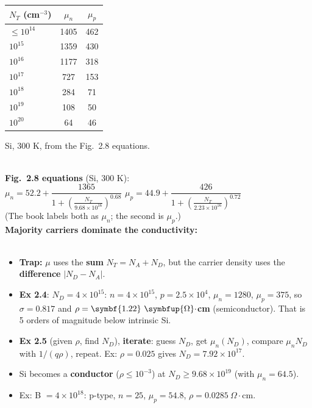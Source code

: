     \begin{minipage}[c]{0.55\linewidth}\raggedright
        {\setlength{\tabcolsep}{2pt}%
        \begin{tabular}{|l|c|c|}
            \hline
            $N_T$ (cm$^{-3}$) & $\mu_n$ & $\mu_p$ \\ \hline
            $\le10^{14}$ & 1405 & 462 \\ \hline
            $10^{15}$ & 1359 & 430 \\ \hline
            $10^{16}$ & 1177 & 318 \\ \hline
            $10^{17}$ & 727 & 153 \\ \hline
            $10^{18}$ & 284 & 71 \\ \hline
            $10^{19}$ & 108 & 50 \\ \hline
            $10^{20}$ & 64 & 46 \\ \hline
        \end{tabular}\par}
        {\color{gray}Si, 300 K, from the Fig.\ 2.8 equations.}
    \end{minipage}\\[2pt]
    \textbf{Fig.\ 2.8 equations} (Si, 300 K): \\
    $\mu_n = 52.2 + \dfrac{1365}{1 + \left(\frac{N_T}{9.68\times10^{16}}\right)^{0.68}}$ \quad
    $\mu_p = 44.9 + \dfrac{426}{1 + \left(\frac{N_T}{2.23\times10^{16}}\right)^{0.72}}$\\
    {\color{gray}(The book labels both as $\mu_n$; the second is $\mu_p$.)}\\[1pt]
    \textbf{Majority carriers dominate the conductivity:} \\
    \
    \begin{itemize}
        \item \textbf{Trap:} $\mu$ uses the \textbf{sum} $N_T = N_A + N_D$, but the carrier density uses the \textbf{difference} $|N_D - N_A|$.
        \item \textbf{Ex 2.4}: $N_D = 4\times10^{15}$: $n = 4\times10^{15}$, $p = 2.5\times10^4$, $\mu_n = 1280$, $\mu_p = 375$, so $\sigma = 0.817$ and $\rho = \symbf{1.22}\ \symbfup{\Omega}\cdot$\textbf{cm} (semiconductor). That is 5 orders of magnitude below intrinsic Si. 
        \item \textbf{Ex 2.5} (given $\rho$, find $N_D$), \textbf{iterate}: guess $N_D$, get $\mu_n(N_D)$, compare $\mu_nN_D$ with $1/(q\rho)$, repeat. Ex: $\rho = 0.025$ gives $N_D = 7.92\times10^{17}$. \tb{p.57}
        \item Si becomes a \textbf{conductor} ($\rho \le 10^{-3}$) at $N_D \ge 9.68\times10^{19}$ (with $\mu_n = 64.5$).
        \item Ex: B $= 4\times10^{18}$: p-type, $n = 25$, $\mu_p = 54.8$, $\rho = 0.0285\ \Omega\cdot$cm. \tb{p.58}
    \end{itemize}

